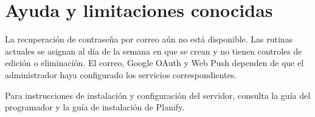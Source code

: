 \documentclass[12pt,a4paper]{article}
\begin{document}
\section{Ayuda y limitaciones conocidas}
La recuperación de contraseña por correo aún no está disponible. Las rutinas actuales se asignan al día de la semana en que se crean y no tienen controles de edición o eliminación. El correo, Google OAuth y Web Push dependen de que el administrador haya configurado los servicios correspondientes.

Para instrucciones de instalación y configuración del servidor, consulta la guía del programador y la guía de instalación de Planify.
\end{document}
